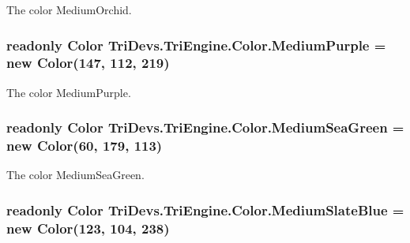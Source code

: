 The color Medium\-Orchid. 

\hypertarget{struct_tri_devs_1_1_tri_engine_1_1_color_a6a90eb3c8e0e3898f428f6ad6fd8b48f}{
\subsubsection[{Medium\-Purple}]{\setlength{\rightskip}{0pt plus 5cm}readonly {\bf Color} Tri\-Devs.\-Tri\-Engine.\-Color.\-Medium\-Purple = new {\bf Color}(147, 112, 219)\hspace{0.3cm}{\ttfamily [static]}}}\label{struct_tri_devs_1_1_tri_engine_1_1_color_a6a90eb3c8e0e3898f428f6ad6fd8b48f}


The color Medium\-Purple. 

\hypertarget{struct_tri_devs_1_1_tri_engine_1_1_color_ad328abb80abfe4f9ff2a544f9081865a}{
\subsubsection[{Medium\-Sea\-Green}]{\setlength{\rightskip}{0pt plus 5cm}readonly {\bf Color} Tri\-Devs.\-Tri\-Engine.\-Color.\-Medium\-Sea\-Green = new {\bf Color}(60, 179, 113)\hspace{0.3cm}{\ttfamily [static]}}}\label{struct_tri_devs_1_1_tri_engine_1_1_color_ad328abb80abfe4f9ff2a544f9081865a}


The color Medium\-Sea\-Green. 

\hypertarget{struct_tri_devs_1_1_tri_engine_1_1_color_a03bb333bde2d78e2abab1ca21ace9dfe}{
\subsubsection[{Medium\-Slate\-Blue}]{\setlength{\rightskip}{0pt plus 5cm}readonly {\bf Color} Tri\-Devs.\-Tri\-Engine.\-Color.\-Medium\-Slate\-Blue = new {\bf Color}(123, 104, 238)\hspace{0.3cm}{\ttfamily [static]}}}\label{struct_tri_devs_1_1_tri_engine_1_1_color_a03bb333bde2d78e2abab1ca21ace9dfe}


